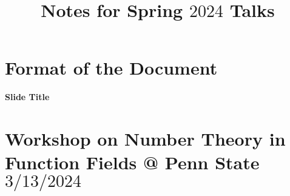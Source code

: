 \documentclass[11pt]{amsart}
\theoremstyle{definition}
\numberwithin{equation}{section}
\begin{document}
	
	\title{Notes for Spring $2024$ Talks}

	\tableofcontents
	\maketitle
	
	\section*{Format of the Document}
	\textbf{Slide Title}\\
	
	\section{Workshop on Number Theory in Function Fields @ Penn State $3/13/2024$}
	
\end{document}

